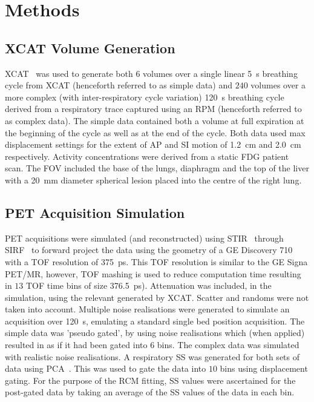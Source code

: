 \section{Methods} \label{sec:methods}
    \subsection{XCAT Volume Generation} \label{sec:xcat_volume_generation}
        \gls{XCAT}~\cite{Segars2010} was used to generate both $6$ volumes over a single linear \SI{5}{\second} breathing cycle from \gls{XCAT} (henceforth referred to as simple data) and $240$ volumes over a more complex (with inter-respiratory cycle variation) \SI{120}{\second} breathing cycle derived from a respiratory trace captured using an \gls{RPM} (henceforth referred to as complex data). The simple data contained both a volume at full expiration at the beginning of the cycle as well as at the end of the cycle. Both data used max displacement settings for the extent of \gls{AP} and \gls{SI} motion of \SI{1.2}{\centi\metre} and \SI{2.0}{\centi\metre} respectively. Activity concentrations were derived from a static \gls{FDG} patient scan. The \gls{FOV} included the base of the lungs, diaphragm and the top of the liver with a \SI{20}{\milli\metre} diameter spherical lesion placed into the centre of the right lung.
    
    \subsection{PET Acquisition Simulation} \label{sec:pet_acquisition_simulation}
        \gls{PET} acquisitions were simulated (and reconstructed) using \gls{STIR}~\cite{Thielemans2012, Efthimiou2018} through \gls{SIRF}~\cite{ Ovtchinnikov2019CCPPETMRSIRF} to forward project the data using the geometry of a \gls{GE} Discovery 710 with a \gls{TOF} resolution of \SI{375}{\pico\second}. This \gls{TOF} resolution is similar to the \gls{GE} Signa \gls{PET}/\gls{MR}, however, \gls{TOF} mashing is used to reduce computation time resulting in $13$ \gls{TOF} time bins of size \SI{376.5}{\pico\second}). Attenuation was included, in the simulation, using the relevant  generated by \gls{XCAT}. Scatter and randoms were not taken into account. Multiple noise realisations were generated to simulate an acquisition over \SI{120}{\second}, emulating a standard single bed position acquisition. The simple data was 'pseudo gated', by using noise realisations which (when applied) resulted in as if it had been gated into $6$ bins. The complex data was simulated with realistic noise realisations. A respiratory \gls{SS} was generated for both sets of data using \gls{PCA}~\cite{Thielemans2011}. This was used to gate the data into $10$ bins using displacement gating. For the purpose of the \gls{RCM} fitting, \gls{SS} values were ascertained for the post-gated data by taking an average of the \gls{SS} values of the data in each bin.
    
